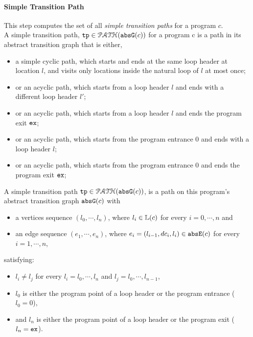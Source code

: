 \paragraph{Simple Transition Path} This step computes the set of all \emph{simple transition paths} for a program $c$.
\\
%
A simple transition path, $\mathtt{tp} \in \mathcal{PATH}(\mathtt{abs}{\mathtt{G}}(c))$ for a program c is
a path in its abstract transition graph that is either,
\begin{itemize}
  \item a simple cyclic path, which starts and ends at the same loop header at location $l$, 
  and visits only locations inside the natural loop of $l$ at most once;
  \item or an acyclic path, which starts from a loop header $l$ 
and ends with a different loop header $l'$;
\item or an acyclic path, which starts from a loop header $l$ 
and ends the program exit $\mathtt{ex}$;
\item or an acyclic path, which starts from the program entrance $0$
and ends with a loop header $l$;
\item or an acyclic path, which starts from the program entrance $0$
and ends the program exit $\mathtt{ex}$;
\end{itemize}
  \begin{defn}
  A simple transition path
  $\mathtt{tp} \in \mathcal{PATH}(\mathtt{abs}{\mathtt{G}}(c))$, is a path on this program's abstract transition graph $\mathtt{abs}{\mathtt{G}}(c)$ with 
  \begin{itemize}
  \item a vertices sequence $(l_0, \cdots, l_n)$, where $l_i \in \mathbb{L}(c)$ for every $i = 0, \cdots, n$ and
  \item an edge sequence $(e_1, \cdots, e_n)$, where $e_i = (l_{i - 1}, dc_i, l_{i}) \in \mathtt{abs}{\mathtt{E}}(c)$ for every $i = 1, \cdots, n$,
  \end{itemize}
  satisfying:
  \begin{itemize}
    \item $l_i \neq l_j$ for every $l_i = l_0, \cdots, l_n$ and $l_j = l_0, \cdots, l_{n - 1}$,
    \item $l_0$ is either the program point of a loop header or the program entrance ($l_0 = 0$),
    \item and $l_n$ is either the program point of a loop header or the program exit ($l_n = \mathtt{ex}$).
  \end{itemize}
  \end{defn}

